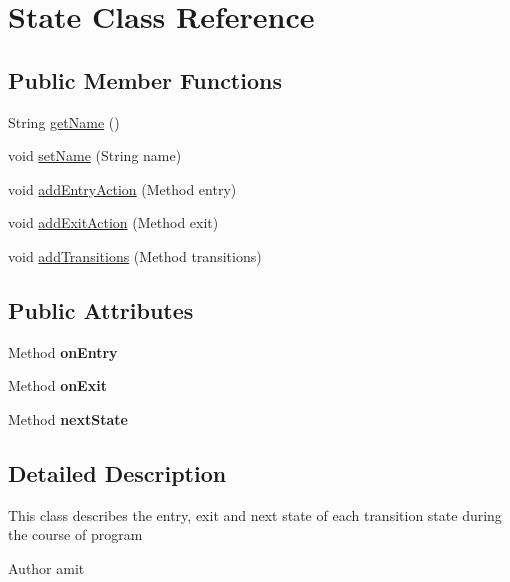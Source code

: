 \hypertarget{class_state}{\section{State Class Reference}
\label{class_state}
}
\subsection*{Public Member Functions}
\begin{DoxyCompactItemize}
\item 
String \hyperlink{class_state_a2366ee1a7f1f44c75588c282520b7f1f}{get\-Name} ()
\item 
void \hyperlink{class_state_a84f6bf30ca26f93109f8b61e6a661ccb}{set\-Name} (String name)
\item 
void \hyperlink{class_state_aa909e96de36cd52f36e451eb223a8abc}{add\-Entry\-Action} (Method entry)
\item 
void \hyperlink{class_state_a3243408f4e2b54aa84738e285cf6f400}{add\-Exit\-Action} (Method exit)
\item 
void \hyperlink{class_state_ab8224460e24ecc6d6bd77f895d98aba1}{add\-Transitions} (Method transitions)
\end{DoxyCompactItemize}
\subsection*{Public Attributes}
\begin{DoxyCompactItemize}
\item 
\hypertarget{class_state_aa4ad4ae247532abaee49cb794e25ba57}{Method {\bfseries on\-Entry}}\label{class_state_aa4ad4ae247532abaee49cb794e25ba57}

\item 
\hypertarget{class_state_a2c6bcf1d0e84499ff2a95f0ce7d6face}{Method {\bfseries on\-Exit}}\label{class_state_a2c6bcf1d0e84499ff2a95f0ce7d6face}

\item 
\hypertarget{class_state_adc3230770759c25d37100af107aec281}{Method {\bfseries next\-State}}\label{class_state_adc3230770759c25d37100af107aec281}

\end{DoxyCompactItemize}


\subsection{Detailed Description}
This class describes the entry, exit and next state of each transition state during the course of program \begin{DoxyAuthor}{Author}
amit 
\end{DoxyAuthor}


